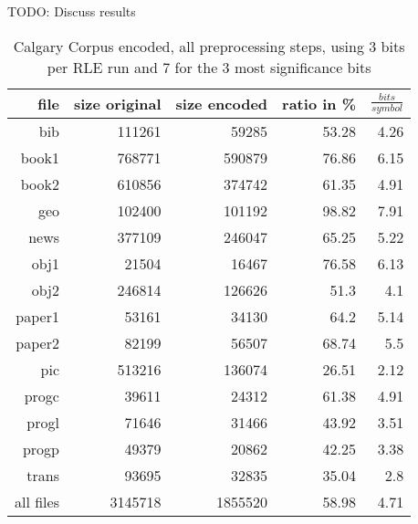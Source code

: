 \par{
TODO: Discuss results
\\
\begin{table}[H]
	\centering
	\begin{tabular}{r|r|r|r|r}	
		file & size original & size encoded & ratio in \% & $\frac{bits}{symbol}$\\
		\hline
		bib & 111261 & 59285 & 53.28 & 4.26 \\  
		book1 & 768771 & 590879 & 76.86 & 6.15 \\  
		book2 & 610856 & 374742 & 61.35 & 4.91 \\  
		geo & 102400 & 101192 & 98.82 & 7.91 \\  
		news & 377109 & 246047 & 65.25 & 5.22 \\  
		obj1 & 21504 & 16467 & 76.58 & 6.13 \\  
		obj2 & 246814 & 126626 & 51.3 & 4.1 \\  
		paper1 & 53161 & 34130 & 64.2 & 5.14 \\  
		paper2 & 82199 & 56507 & 68.74 & 5.5 \\  
		pic & 513216 & 136074 & 26.51 & 2.12 \\  
		progc & 39611 & 24312 & 61.38 & 4.91 \\  
		progl & 71646 & 31466 & 43.92 & 3.51 \\  
		progp & 49379 & 20862 & 42.25 & 3.38 \\  
		trans & 93695 & 32835 & 35.04 & 2.8 \\
		\hline
		all files & 3145718 & 1855520 & 58.98 & 4.71
	\end{tabular}
	\caption{Calgary Corpus encoded, all preprocessing steps, using 3 bits per RLE run and 7 for the 3 most significance bits}
	\label{tab:t5:Calgary Corpus encoded, all preprocessing steps, using 3 bits per RLE run and 7 for the 3 most significance bits}
\end{table}
}


